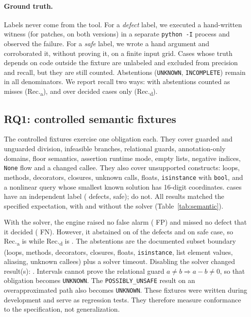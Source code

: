 \documentclass[10pt,twocolumn]{article}
\newcommand{\res}[1]{\texttt{\small #1}}
\begin{document}
\paragraph{Ground truth.}
Labels never come from the tool. For a \emph{defect} label, we executed a hand-written witness (for patches, on both
versions) in a separate \texttt{python -I} process and observed the failure. For a \emph{safe} label, we wrote a hand
argument and corroborated it, without proving it, on a finite input grid. Cases whose truth depends on code outside
the fixture are unlabeled and excluded from precision and recall, but they are still counted. Abstentions (\res{UNKNOWN},
\res{INCOMPLETE}) remain in all denominators. We report recall two ways: with abstentions counted as misses
(Rec.\textsubscript{a}), and over decided cases only (Rec.\textsubscript{d}).

\subsection{RQ1: controlled semantic fixtures}

The \SemCases{} controlled fixtures exercise one obligation each. They cover guarded and unguarded division, infeasible
branches, relational guards, annotation-only domains, floor semantics, assertion runtime mode, empty lists, negative
indices, \texttt{None} flow and a changed callee. They also cover unsupported constructs: loops, methods, decorators,
closures, unknown calls, floats, \texttt{isinstance} with \texttt{bool}, and a nonlinear query whose smallest known
solution has 16-digit coordinates. \SemLabeled{} cases have an independent label (\SemPos{} defects, \SemNeg{} safe);
\SemIndeterminate{} do not. All \SemCases{} results matched the specified expectation, with and without the solver
(Table~\ref{tab:semantic}).

With the solver, the engine raised no false alarm (\SemFP{} FP) and missed no defect that it decided (\SemFN{} FN).
However, it abstained on \SemAbstainPos{} of the \SemPos{} defects and on \SemAbstainNeg{} safe case, so
Rec.\textsubscript{a} is \SemRecallA{} while Rec.\textsubscript{d} is \SemRecallD{}. The abstentions are the documented
subset boundary (loops, methods, decorators, closures, floats, \texttt{isinstance}, list element values, aliasing,
unknown callees) plus a solver timeout. Disabling the solver changed \SemSolverChanged{} result(s): \SemSolverChangedList.
Intervals cannot prove the relational guard $a \ne b \Rightarrow a-b \ne 0$, so that obligation becomes \res{UNKNOWN}.
The \res{POSSIBLY\_UNSAFE} result on an overapproximated path also becomes \res{UNKNOWN}. These fixtures were written
during development and serve as regression tests. They therefore measure conformance to the specification, not
generalization.
\end{document}
